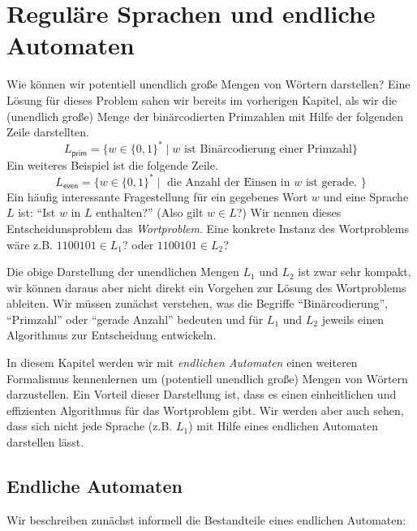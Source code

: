 \section[Reguläre Sprachen und endliche Automaten]{Reguläre Sprachen und endliche Automaten}
Wie können wir potentiell unendlich große Mengen von Wörtern darstellen?
Eine Lösung für dieses Problem sahen wir bereits im vorherigen Kapitel, als wir die (unendlich große) Menge der binärcodierten Primzahlen mit Hilfe der folgenden Zeile darstellten.
\[
L_\mathsf{prim}=\{w\in\{0,1\}^*\mid w \text{ ist Bin\"arcodierung einer Primzahl}\}
\]
Ein weiteres Beispiel ist die folgende Zeile.
\[
L_\mathsf{even}=\{w\in\{0,1\}^*\mid \text{ die Anzahl der Einsen in $w$ ist gerade. }\}
\]
Ein häufig interessante Fragestellung für ein gegebenes Wort $w$ und eine Sprache $L$ ist: ``Ist $w$ in $L$ enthalten?'' (Also gilt $w\in L$?)
Wir nennen dieses Entscheidunsproblem das \emph{Wortproblem}. Eine konkrete Instanz des Wortproblems wäre z.B. $1100101\in L_1$? oder $1100101\in L_2$?

Die obige Darstellung der unendlichen Mengen $L_1$ und $L_2$ ist zwar sehr kompakt, 
wir können daraus aber nicht direkt ein Vorgehen zur Lösung des Wortproblems ableiten.
Wir müssen zunächst verstehen, was die Begriffe ``Binärcodierung'', ``Primzahl'' oder ``gerade Anzahl'' bedeuten und für $L_1$ und $L_2$ jeweils einen Algorithmus zur Entscheidung entwickeln.

In diesem Kapitel werden wir mit \emph{endlichen Automaten} einen weiteren Formalismus kennenlernen um (potentiell unendlich große) Mengen von Wörtern darzustellen. 
Ein Vorteil dieser Darstellung ist, dass es einen einheitlichen und effizienten Algorithmus für das Wortproblem gibt.
Wir werden aber auch sehen, dass sich nicht jede Sprache (z.B. $L_1$) mit Hilfe eines endlichen Automaten darstellen lässt.

\subsection{Endliche Automaten}
Wir beschreiben zunächst informell die Bestandteile eines endlichen Automaten:

\newcommand{\qinit}{{q^\mathsf{init}}}
\newcommand{\B}{\mathcal{B}}
\newcommand{\calN}{\mathcal{N}}
\newcommand{\calP}{\mathcal{P}}
\newcommand{\ecl}{\textsf{ecl}}
\newcommand{\reach}{\textsf{reach}}
\newcommand{\hide}[1]{}

